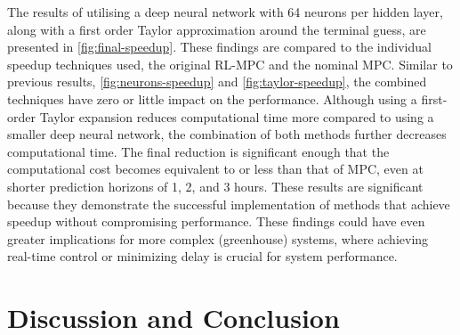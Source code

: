 The results of utilising a deep neural network with 64 neurons per hidden layer, along with a first order Taylor approximation around the terminal guess, are presented in \autoref{fig:final-speedup}. These findings are compared to the individual speedup techniques used, the original RL-MPC and the nominal MPC. Similar to previous results, \autoref{fig:neurons-speedup} and \autoref{fig:taylor-speedup}, the combined techniques have zero or little impact on the performance. Although using a first-order Taylor expansion reduces computational time more compared to using a smaller deep neural network, the combination of both methods further decreases computational time. The final  reduction is significant enough that the computational cost becomes equivalent to or less than that of MPC, even at shorter prediction horizons of 1, 2, and 3 hours. These results are significant because they demonstrate the successful implementation of methods that achieve speedup without compromising performance. These findings could have even greater implications for more complex (greenhouse) systems, where achieving real-time control or minimizing delay is crucial for system performance.



\section{Discussion and Conclusion}

